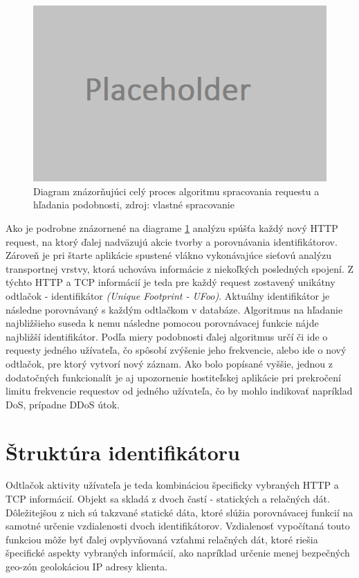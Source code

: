 \documentclass[
  digital, %
  table,   %
  lof,     %
  nolot,   %
  nocover
]{fithesis3}
\begin{document}
\begin{figure}[h]
  \centering
    \includegraphics[width=.99\textwidth]{images/footprint-hl.png}
  \caption{Diagram znázorňujúci celý proces algoritmu spracovania requestu a
  hľadania podobnosti, zdroj: vlastné spracovanie}
  \label{fig:footprint-hl}
\end{figure}

Ako je podrobne znázornené na diagrame \ref{fig:footprint-hl} analýzu spúšťa každý nový
HTTP request, na ktorý ďalej nadväzujú akcie tvorby a porovnávania
identifikátorov. Zároveň je pri štarte aplikácie spustené vlákno vykonávajúce
sieťovú analýzu transportnej vrstvy, ktorá uchováva informácie z niekoľkých
posledných spojení. Z týchto HTTP a TCP informácií je teda pre každý request
zostavený unikátny odtlačok - identifikátor \textit{(Unique Footprint - UFoo)}.
Aktuálny identifikátor je následne porovnávaný s každým odtlačkom v databáze.
Algoritmus na hľadanie najbližšieho suseda k nemu následne pomocou porovnávacej
funkcie nájde najbližší identifikátor. Podľa miery podobnosti ďalej
algoritmus určí či ide o requesty jedného užívateľa, čo spôsobí zvýšenie jeho
frekvencie, alebo ide o nový odtlačok, pre ktorý vytvorí nový záznam.
Ako bolo popísané vyššie, jednou z dodatočných funkcionalít je aj upozornenie hostiteľskej aplikácie pri
prekročení limitu frekvencie requestov od jedného užívateľa, čo by mohlo
indikovať napríklad DoS, prípadne DDoS útok.

\section{Štruktúra identifikátoru}
\label{s:footprint-structure}
Odtlačok aktivity užívateľa je teda kombináciou špecificky vybraných HTTP a TCP informácií.
Objekt sa skladá z dvoch častí - statických a relačných dát. Dôležitejšou z
nich sú takzvané statické dáta, ktoré slúžia porovnávacej funkcií na samotné
určenie vzdialenosti dvoch identifikátorov. Vzdialenosť vypočítaná touto
funkciou môže byť ďalej ovplyvňovaná vzťahmi relačných dát, ktoré riešia
špecifické aspekty vybraných informácií, ako napríklad určenie menej bezpečných
geo-zón geolokáciou IP adresy klienta.
\end{document}
